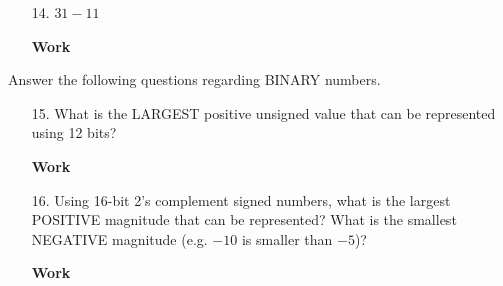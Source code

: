 \documentclass[12pt]{article}
\begin{document}
\begin{enumerate}
\item[14.] $31-11$
\end{enumerate}

\begin{enumerate}
  \item[\textbf{Work}]
\end{enumerate}

\noindent Answer the following questions regarding BINARY numbers.
\begin{enumerate}
\item[15.] What is the LARGEST positive unsigned value that can be represented using 12 bits?
\end{enumerate}

\begin{enumerate}
  \item[\textbf{Work}]
\end{enumerate}


\begin{enumerate}
\item[16.] Using 16-bit 2’s complement signed numbers, what is the largest POSITIVE magnitude that can be represented?  What is the smallest NEGATIVE magnitude (e.g. $-10$ is smaller than $-5$)?
\end{enumerate}

\begin{enumerate}
  \item[\textbf{Work}]
\end{enumerate}
\end{document}
